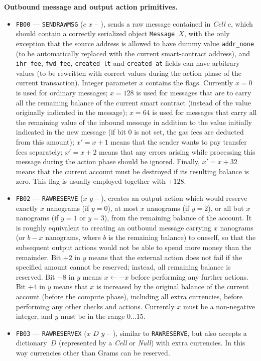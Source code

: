 \documentclass[12pt,oneside]{article}
\def\makepoint#1{\medbreak\noindent{\bf #1.\ }}
\def\nxsubpoint{\refstepcounter{subsubsection}%
  \smallbreak\makepoint{\thesubsubsection}}
\def\emb#1{\textbf{#1.}}
\begin{document}
\nxsubpoint\emb{Outbound message and output action primitives}
\begin{itemize}
\item {\tt FB00} --- {\tt SENDRAWMSG} ($c$ $x$ -- ), sends a raw message contained in {\em Cell $c$}, which should contain a correctly serialized object {\tt Message $X$}, with the only exception that the source address is allowed to have dummy value {\tt addr\_none} (to be automatically replaced with the current smart-contract address), and {\tt ihr\_fee}, {\tt fwd\_fee}, {\tt created\_lt} and {\tt created\_at} fields can have arbitrary values (to be rewritten with correct values during the action phase of the current transaction). Integer parameter $x$ contains the flags. Currently $x=0$ is used for ordinary messages; $x=128$ is used for messages that are to carry all the remaining balance of the current smart contract (instead of the value originally indicated in the message); $x=64$ is used for messages that carry all the remaining value of the inbound message in addition to the value initially indicated in the new message (if bit 0 is not set, the gas fees are deducted from this amount); $x'=x+1$ means that the sender wants to pay transfer fees separately; $x'=x+2$ means that any errors arising while processing this message during the action phase should be ignored. Finally, $x'=x+32$ means that the current account must be destroyed if its resulting balance is zero. This flag is usually employed together with $+128$.
\item {\tt FB02} --- {\tt RAWRESERVE} ($x$ $y$ -- ), creates an output action which would reserve exactly $x$ nanograms (if $y=0$), at most $x$ nanograms (if $y=2$), or all but $x$ nanograms (if $y=1$ or $y=3$), from the remaining balance of the account. It is roughly equivalent to creating an outbound message carrying $x$ nanograms (or $b-x$ nanograms, where $b$ is the remaining balance) to oneself, so that the subsequent output actions would not be able to spend more money than the remainder. Bit $+2$ in $y$ means that the external action does not fail if the specified amount cannot be reserved; instead, all remaining balance is reserved. Bit $+8$ in $y$ means $x\leftarrow -x$ before performing any further actions. Bit $+4$ in $y$ means that $x$ is increased by the original balance of the current account (before the compute phase), including all extra currencies, before performing any other checks and actions. Currently $x$ must be a non-negative integer, and $y$ must be in the range $0\ldots 15$.
\item {\tt FB03} --- {\tt RAWRESERVEX} ($x$ $D$ $y$ -- ), similar to {\tt RAWRESERVE}, but also accepts a dictionary~$D$ (represented by a {\em Cell\/} or {\em Null\/}) with extra currencies. In this way currencies other than Grams can be reserved.

\end{itemize}
\end{document}
